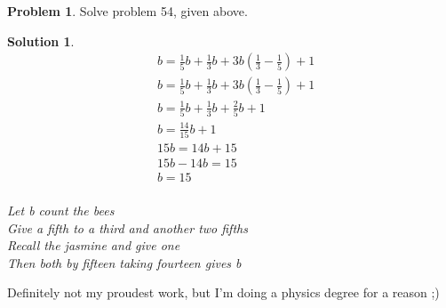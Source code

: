 \documentclass[10pt]{article}
\theoremstyle{definition}
\newtheorem{problem}{Problem}
\newtheorem{soln}{Solution}
\begin{document}
\begin{problem}
Solve problem 54, given above.
\end{problem}
\begin{soln} ~\\
    \begin{align*}
         & b = \frac{1}{5}b + \frac{1}{3}b + 3b(\frac{1}{3} - \frac{1}{5}) + 1 \\
         & b = \frac{1}{5}b + \frac{1}{3}b + 3b(\frac{1}{3} - \frac{1}{5}) + 1 \\
         & b = \frac{1}{5}b + \frac{1}{3}b + \frac{2}{5}b + 1                  \\
         & b = \frac{14}{15}b + 1                                              \\
         & 15b = 14b + 15                                                      \\
         & 15b - 14b = 15                                                      \\
         & b = 15                                                              \\
    \end{align*}

    \begin{center}
        \textit{
            Let b count the bees \\
            Give a fifth to a third and another two fifths \\
            Recall the jasmine and give one \\
            Then both by fifteen taking fourteen gives b \\
        }
    \end{center}

    \noindent Definitely not my proudest work, but I'm doing a physics degree for a reason ;)
\end{soln}

\newpage
\end{document}
